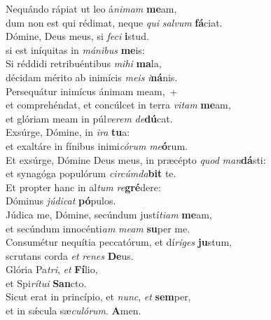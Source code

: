 \evenverse Nequándo rápiat ut leo á\textit{ni}\textit{mam} \textbf{me}am,~\*\\
\evenverse dum non est qui rédimat, neque \textit{qui} \textit{sal}\textit{vum} \textbf{fá}ciat.\\
\oddverse Dómine, Deus meus, si \textit{fe}\textit{ci} \textbf{i}stud.~\*\\
\oddverse si est iníquitas in \textit{má}\textit{ni}\textit{bus} \textbf{me}is:\\
\evenverse Si réddidi retribuéntibus \textit{mi}\textit{hi} \textbf{ma}la,~\*\\
\evenverse décidam mérito ab inimícis \textit{me}\textit{is} \textit{i}\textbf{ná}nis.\\
\oddverse Persequátur inimícus ánimam meam,~+\\
\oddverse  et comprehéndat, et concúlcet in terra \textit{vi}\textit{tam} \textbf{me}am,~\*\\
\oddverse et glóriam meam in púl\textit{ve}\textit{rem} \textit{de}\textbf{dú}cat.\\
\evenverse Exsúrge, Dómine, in \textit{i}\textit{ra} \textbf{tu}a:~\*\\
\evenverse et exaltáre in fínibus inimi\textit{có}\textit{rum} \textit{me}\textbf{ó}rum.\\
\oddverse Et exsúrge, Dómine Deus meus, in præcépto \textit{quod} \textit{man}\textbf{dá}sti:~\*\\
\oddverse et synagóga populórum \textit{cir}\textit{cúm}\textit{da}\textbf{bit} te.\\
\evenverse Et propter hanc in al\textit{tum} \textit{re}\textbf{gré}dere:~\*\\
\evenverse Dóminus \textit{jú}\textit{di}\textit{cat} \textbf{pó}pulos.\\
\oddverse Júdica me, Dómine, secúndum justí\textit{ti}\textit{am} \textbf{me}am,~\*\\
\oddverse et secúndum innocénti\textit{am} \textit{me}\textit{am} \textbf{su}per me.\\
\evenverse Consumétur nequítia peccatórum, et dí\textit{ri}\textit{ges} \textbf{ju}stum,~\*\\
\evenverse scrutans corda \textit{et} \textit{re}\textit{nes} \textbf{De}us.\\
\oddverse Glória Pa\textit{tri}, \textit{et} \textbf{Fí}lio,~\*\\
\oddverse et Spi\textit{rí}\textit{tu}\textit{i} \textbf{San}cto.\\
\evenverse Sicut erat in princípio, et \textit{nunc}, \textit{et} \textbf{sem}per,~\*\\
\evenverse et in sǽcula sæ\textit{cu}\textit{ló}\textit{rum}. \textbf{A}men.\\
